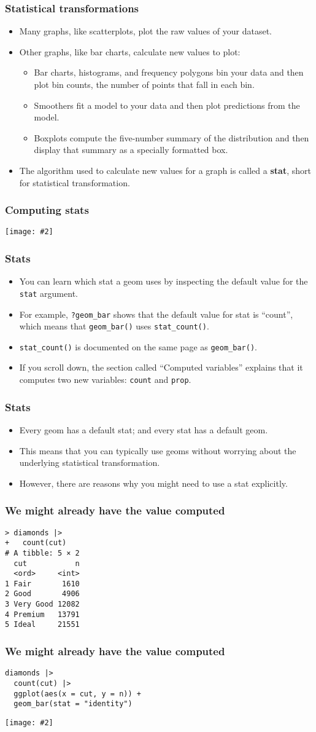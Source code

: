 \documentclass{beamer}
\newcommand{\bi}{\begin{itemize}}
\newcommand{\li}{\item}
\newcommand{\ei}{\end{itemize}}
\newcommand{\fig}[2]{\centerline{\texttt{[image: \#2]}}}
\newcommand{\bfr}[1]{\begin{frame}[fragile]\frametitle{{ #1 }}}
\begin{document}
\bfr{Statistical transformations}
\bi
\li  Many graphs, like scatterplots, plot the raw values of your dataset.
\li Other graphs, like bar charts, calculate new values to plot:
\bi
\li
Bar charts, histograms, and frequency polygons bin your data and then plot bin counts, the number of points that fall in each bin.
\li
Smoothers fit a model to your data and then plot predictions from the model.
\li
Boxplots compute the five-number summary of the distribution and then display that summary as a specially formatted box.
\ei
\li
The algorithm used to calculate new values for a graph is called a {\bf stat}, short for statistical transformation.
\ei
\end{frame}

\bfr{Computing stats}
\fig{1.25}{visualization-stat-bar.png}
\end{frame}

\bfr{Stats}
\bi
\li You can learn which stat a geom uses by inspecting the default value for the \verb|stat| argument.
\li For example, \verb|?geom_bar| shows that the default value for stat is “count”, which means that \verb|geom_bar()| uses \verb|stat_count()|.
\li  \verb|stat_count()| is documented on the same page as \verb|geom_bar()|.
\li If you scroll down, the section called “Computed variables” explains that it computes two new variables: \verb|count| and \verb|prop|.
\ei
\end{frame}

\bfr{Stats}
\bi
\li Every geom has a default stat; and every stat has a default geom. 
\li This means that you can typically use geoms without worrying about the underlying statistical transformation.
\li However, there are  reasons why you might need to use a stat explicitly.

\ei
\end{frame}


\bfr{We might already have the value computed}
\begin{verbatim}
> diamonds |>
+   count(cut) 
# A tibble: 5 × 2
  cut           n
  <ord>     <int>
1 Fair       1610
2 Good       4906
3 Very Good 12082
4 Premium   13791
5 Ideal     21551
\end{verbatim}
\end{frame}



\bfr{We might already have the value computed}\scriptsize
\begin{verbatim}
diamonds |>
  count(cut) |>
  ggplot(aes(x = cut, y = n)) +
  geom_bar(stat = "identity")
\end{verbatim}
\fig{.8}{unnamed-chunk-30-1.png}
\end{frame}
\end{document}
